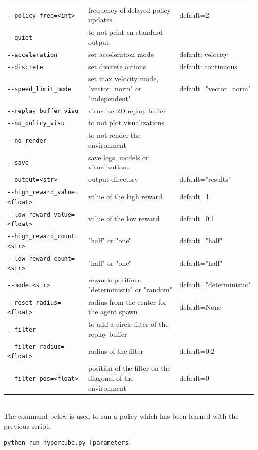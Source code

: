 \documentclass{article}
\begin{document}
\begin{center}
\begin{longtable}{l l l}
    \lstinline|--policy_freq=<int>| & frequency of delayed policy updates & default=2\\
    \lstinline|--quiet| & to not print on standard output &\\
    \lstinline|--acceleration| & set acceleration mode & default: velocity\\
    \lstinline|--discrete| & set discrete actions & default: continuous\\
    \lstinline|--speed_limit_mode| & set max velocity mode, "vector\_norm" or "independent" & default="vector\_norm"\\
    \lstinline|--replay_buffer_visu| & visualize 2D replay buffer&\\
    \lstinline|--no_policy_visu| & to not plot visualizations&\\
    \lstinline|--no_render| & to not render the environment&\\
    \lstinline|--save| & save logs, models or visualizations&\\
    \lstinline|--output=<str>| & output directory & default="results"\\
    \lstinline|--high_reward_value=<float>| & value of the high reward & default=1\\
    \lstinline|--low_reward_value=<float>| & value of the low reward & default=0.1\\
    \lstinline|--high_reward_count=<str>| & "half" or "one" & default="half"\\
    \lstinline|--low_reward_count=<str>| & "half" or "one" & default="half"\\
    \lstinline|--mode=<str>| & rewards positions "deterministic" or "random" & default="deterministic"\\
    \lstinline|--reset_radius=<float>| & radius from the center for the agent spawn & default=None\\
    \lstinline|--filter| & to add a circle filter of the replay buffer & \\
    \lstinline|--filter_radius=<float>| & radius of the filter & default=0.2\\
    \lstinline|--filter_pos=<float>| & position of the filter on the diagonal of the environment & default=0\\
\end{longtable}
\end{center}

\ \\

The command below is used to run a policy which has been learned with the previous script.
\begin{lstlisting}
python run_hypercube.py [parameters]
\end{lstlisting}
\end{document}
